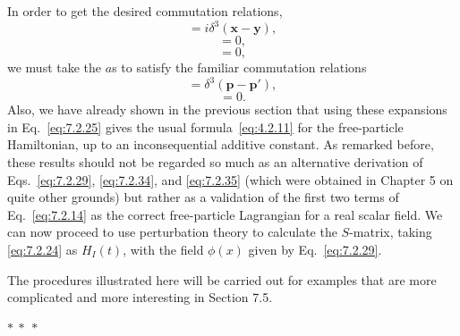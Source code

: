 In order to get the desired commutation relations,
\begin{equation}
[\phi(\mathbf{x},t),\pi(\mathbf{y},t)]=i\delta^3(\mathbf{x}-\mathbf{y}),
\tag{7.2.31}\label{eq:7.2.31}
\end{equation}
\begin{equation}
[\phi(\mathbf{x},t),\phi(\mathbf{y},t)]=0,
\tag{7.2.32}\label{eq:7.2.32}
\end{equation}
\begin{equation}
[\pi(\mathbf{x},t),\pi(\mathbf{y},t)]=0,
\tag{7.2.33}\label{eq:7.2.33}
\end{equation}
we must take the $a$s to satisfy the familiar commutation relations
\begin{equation}
[a_{\mathbf{p}},a^\dagger_{\mathbf{p}'}]=\delta^3(\mathbf{p}-\mathbf{p}'),
\tag{7.2.34}\label{eq:7.2.34}
\end{equation}
\begin{equation}
[a_{\mathbf{p}},a_{\mathbf{p}'}]=0.
\tag{7.2.35}\label{eq:7.2.35}
\end{equation}
Also, we have already shown in the previous section that using these
expansions in Eq.~\eqref{eq:7.2.25} gives the usual formula~\eqref{eq:4.2.11} for the
free-particle Hamiltonian, up to an inconsequential additive constant. As
remarked before, these results should not be regarded so much as an
alternative derivation of Eqs.~\eqref{eq:7.2.29}, \eqref{eq:7.2.34}, and \eqref{eq:7.2.35} (which were
obtained in Chapter 5 on quite other grounds) but rather as a validation
of the first two terms of Eq.~\eqref{eq:7.2.14} as the correct free-particle Lagrangian
for a real scalar field. We can now proceed to use perturbation theory to
calculate the $S$-matrix, taking \eqref{eq:7.2.24} as $H_I(t)$, with the field $\phi(x)$ given
by Eq.~\eqref{eq:7.2.29}.

The procedures illustrated here will be carried out for examples that
are more complicated and more interesting in Section 7.5.

\begin{center}
$*\ *\ *$
\end{center}

